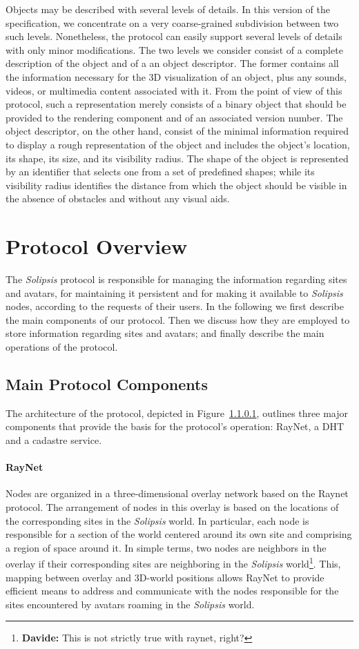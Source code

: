\documentclass{article}
\newcommand{\df}[1]{\footnote{\textbf{Davide: }#1}}
\newcommand{\sol}{\emph{Solipsis}\xspace}
\begin{document}
Objects may be described with several levels of details. In this
version of the specification, we concentrate on a very coarse-grained
subdivision between two such levels. Nonetheless, the protocol can
easily support several levels of details with only minor
modifications. The two levels we consider consist of a complete
description of the object and of a an object descriptor. The former
contains all the information necessary for the 3D visualization of an
object, plus any sounds, videos, or multimedia content associated with
it. From the point of view of this protocol, such a representation
merely consists of a binary object that should be provided to the
rendering component and of an associated version number. The object
descriptor, on the other hand, consist of the minimal information
required to display a rough representation of the object and includes
the object's location, its shape, its size, and its visibility
radius. The shape of the object is represented by an identifier that
selects one from a set of predefined shapes; while its visibility
radius identifies the distance from which the object should be visible
in the absence of obstacles and without any visual aids.



\section{Protocol Overview}
The \sol protocol is responsible for managing the information
regarding sites and avatars, for maintaining it persistent and for
making it available to \sol nodes, according to the requests of their
users. In the following we first describe the main components of our
protocol.  Then we discuss how they are employed to store information
regarding sites and avatars; and finally describe the main operations
of the protocol.

\subsection{Main Protocol Components}
\label{sec:main-prot-comp}
The architecture of the protocol, depicted in Figure~\ref{}, outlines
three major components that provide the basis for the protocol's
operation: RayNet, a DHT and a cadastre service.

\paragraph{RayNet}
Nodes are organized in a three-dimensional overlay network based on
the Raynet protocol. The arrangement of nodes in this overlay is based
on the locations of the corresponding sites in the \sol world. In
particular, each node is responsible for a section of the world
centered around its own site and comprising a region of space around
it. In simple terms, two nodes are neighbors in the overlay if their
corresponding sites are neighboring in the \sol world\df{This is not
  strictly true with raynet, right?}. This, mapping between overlay
and 3D-world positions allows RayNet to provide efficient means to
address and communicate with the nodes responsible for the sites
encountered by avatars roaming in the \sol world.
\end{document}
